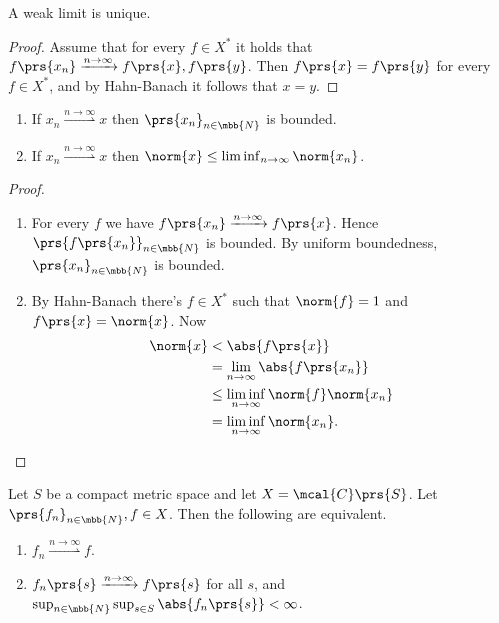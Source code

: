 \documentclass[10pt, twoside]{book}
\begin{document}
\begin{proposition}
A weak limit is unique.
\end{proposition}

\begin{proof}
Assume that for every $f \in X^*$ it holds that $f\prs{x_n} \xrightarrow{n\to\infty} f\prs{x}, f\prs{y}$. Then $f\prs{x} = f\prs{y}$ for every $f \in X^*$, and by Hahn-Banach it follows that $x=y$.
\end{proof}

\begin{proposition}
\begin{enumerate}
\item If $x_n \overset{n\to\infty}{\rightharpoonup} x$ then $\prs{x_n}_{n \in \mbb{N}}$ is bounded.
\item If $x_n \overset{n\to\infty}{\rightharpoonup} x$ then $\norm{x} \leq \liminf_{n\to\infty} \norm{x_n}$.
\end{enumerate}
\end{proposition}

\begin{proof}
\begin{enumerate}
\item For every $f$ we have $f\prs{x_n} \xrightarrow{n\to\infty} f\prs{x}$. Hence $\prs{f\prs{x_n}}_{n \in \mbb{N}}$ is bounded. By uniform boundedness, $\prs{x_n}_{n \in \mbb{N}}$ is bounded.
\item By Hahn-Banach there's $f \in X^*$ such that $\norm{f} = 1$ and $f\prs{x} = \norm{x}$. Now
\begin{align*}
\norm{x} &< \abs{f\prs{x}}
\\&= \lim_{n\to\infty} \abs{f\prs{x_n}}
\\&\leq \liminf_{n\to\infty} \norm{f} \norm{x_n}
\\&= \liminf_{n\to\infty} \norm{x_n} \text{.}
\end{align*}
\end{enumerate}
\end{proof}

\begin{proposition}
Let $S$ be a compact metric space and let $X = \mcal{C}\prs{S}$. Let $\prs{f_n}_{n \in \mbb{N}}, f \in X$. Then the following are equivalent.
\begin{enumerate}
\item $f_n \overset{n\to\infty}{\rightharpoonup} f$.
\item $f_n\prs{s} \xrightarrow{n\to\infty} f\prs{s}$ for all $s$, and $\sup_{n \in \mbb{N}}\sup_{s \in S} \abs{f_n\prs{s}} < \infty$.
\end{enumerate}
\end{proposition}
\end{document}
